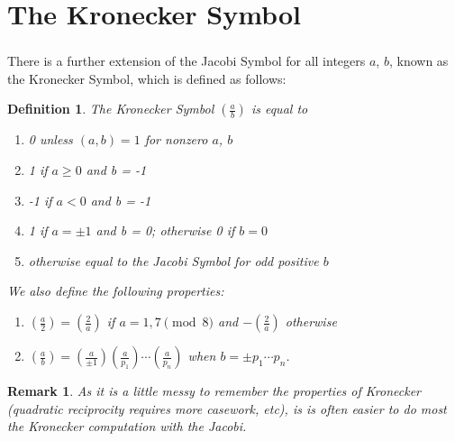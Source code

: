 \documentclass[12pt]{article}
\newtheorem{definition}{Definition}
\newtheorem*{remark}{Remark}
\newcommand{\kronecker}[2]{\genfrac{(}{)}{}{}{#1}{#2}}
\begin{document}
\section{The Kronecker Symbol}
\subsubsection{}
There is a further extension of the Jacobi Symbol for all integers $a$, $b$, known as the Kronecker Symbol, which is defined as follows:
\begin{definition}
    The Kronecker Symbol $\kronecker{a}{b}$ is equal to
    \begin{enumerate}
        \item 0 unless $(a,b) = 1$ for nonzero $a$, $b$
        \item 1 if $a \geq 0$ and b = -1
        \item -1 if $a < 0$ and b = -1
        \item 1 if $a = \pm 1$ and b = 0; otherwise 0 if $b = 0$
        \item otherwise equal to the Jacobi Symbol for odd positive $b$
    \end{enumerate}
    We also define the following properties:
    \begin{enumerate}
        \item $\kronecker{a}{2} = \kronecker{2}{a}$ if $a = 1, 7 \pmod{8}$ and $-\kronecker{2}{a}$ otherwise
        \item $\kronecker{a}{b} = \kronecker{a}{\pm1} \kronecker{a}{p_{1}} \cdots \kronecker{a}{p_{n}}$ when $b = \pm p_{1}\cdots p_{n}$.
        \end{enumerate}
\end{definition}
\begin{remark}
    As it is a little messy to remember the properties of Kronecker (quadratic reciprocity requires more casework, etc), is is often easier to do most the Kronecker computation with the Jacobi.
\end{remark}
\end{document}
